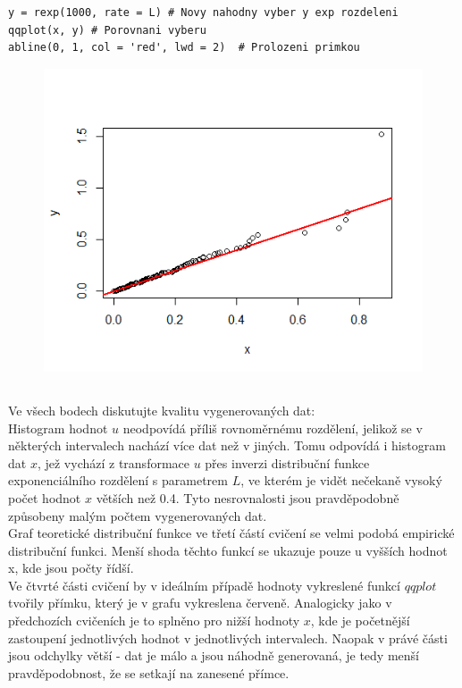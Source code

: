\documentclass[a4paper]{article}
\begin{document}
\lstset{language = r, numbers=left, tabsize = 4, title=Řešení, basicstyle=\footnotesize}
\begin{lstlisting}[firstnumber=16]
y = rexp(1000, rate = L) # Novy nahodny vyber y exp rozdeleni
qqplot(x, y) # Porovnani vyberu
abline(0, 1, col = 'red', lwd = 2)  # Prolozeni primkou
\end{lstlisting}

\begin{figure}[h]
\begin{center}
	\includegraphics{ppapir.png}
\end{center}
\end{figure}

\subsection{}
Ve všech bodech diskutujte kvalitu vygenerovaných dat:
\\
Histogram hodnot $u$ neodpovídá příliš rovnoměrnému rozdělení, jelikož se v některých intervalech nachází více dat než v jiných. Tomu odpovídá i histogram dat $x$, jež vychází z transformace $u$ přes inverzi distribuční funkce exponenciálního rozdělení s parametrem $L$, ve kterém je vidět nečekaně vysoký počet hodnot $x$ větších než 0.4. Tyto nesrovnalosti jsou pravděpodobně způsobeny malým počtem vygenerovaných dat.
\\
Graf teoretické distribuční funkce ve třetí částí cvičení se velmi podobá empirické distribuční funkci. Menší shoda těchto funkcí se ukazuje pouze u vyšších hodnot x, kde jsou počty řídší.
\\
Ve čtvrté části cvičení by v ideálním případě hodnoty vykreslené funkcí $qqplot$ tvořily přímku, který je v grafu vykreslena červeně. Analogicky jako v předchozích cvičeních je to splněno pro nižší hodnoty $x$, kde je početnější zastoupení jednotlivých hodnot v jednotlivých intervalech. Naopak v právé části jsou odchylky větší - dat je málo a jsou náhodně generovaná, je tedy menší pravděpodobnost, že se setkají na zanesené přímce. 
\end{document}
